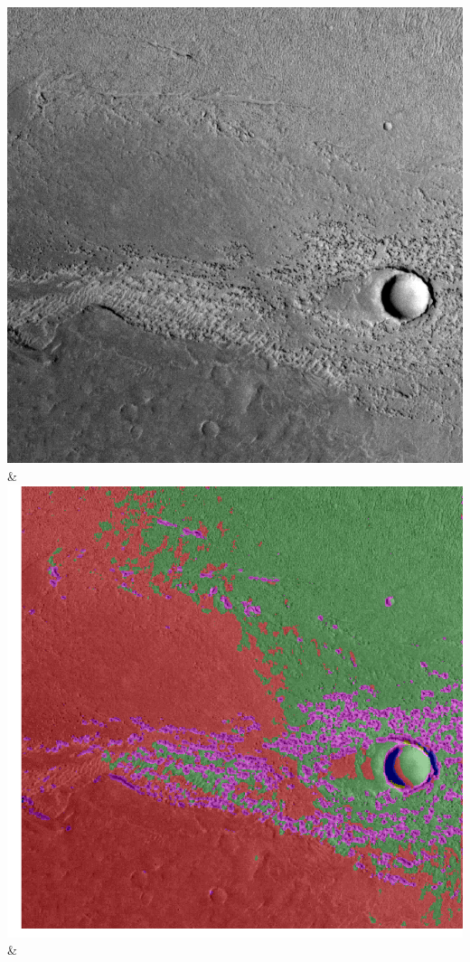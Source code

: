 \begin{table}[h!]
\begin{tabularx}{\textwidth}
		\includegraphics[width=0.9\linewidth]{images/p03/p03_02.png} &
		\includegraphics[width=0.9\linewidth]{images/gen/convolution_number/p03_02.png_2.png} &

\end{tabularx}
\end{table}
